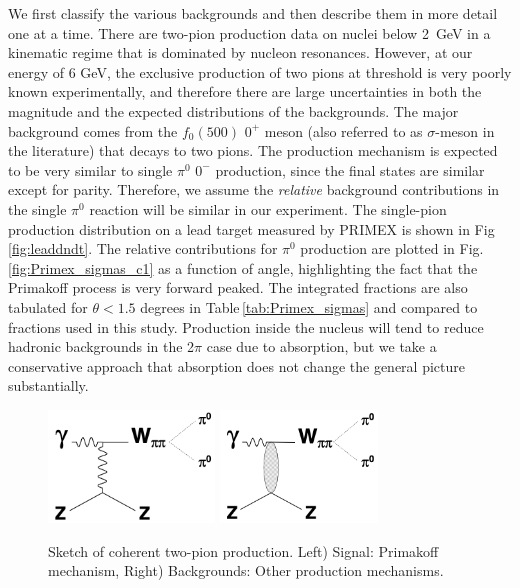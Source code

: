 We first classify the various backgrounds and then describe them in more detail one at a time. There are two-pion production data on nuclei below 2~GeV \cite{schadm2005double} in a kinematic regime that is dominated by nucleon resonances. However, at our energy of 6 GeV, 
the exclusive production of two pions at threshold is very poorly known experimentally, and therefore there are large uncertainties in both the magnitude and the expected distributions of the backgrounds.  The major background comes from the $f_0(500)$ $0^{+}$ meson (also referred to as $\sigma$-meson in the literature) that decays to two pions. The production mechanism is expected to be very similar to single $\pi^0$ $0^{-}$ production, since the final states are similar except for parity. Therefore, we assume the {\em relative} background contributions in the single $\pi^0$ reaction will be similar in our experiment. The single-pion production distribution on a lead target measured by PRIMEX \cite{Larin:2018} is shown in Fig\,\ref{fig:leaddndt}. The relative contributions for $\pi^0$ production are plotted in Fig.\,\ref{fig:Primex_sigmas_c1} as a function of angle, highlighting the fact that the Primakoff process is very forward peaked. The integrated fractions are also tabulated for $\theta < 1.5$ degrees in Table\,\ref{tab:Primex_sigmas} and compared to fractions used in this study.
Production inside the nucleus will tend to reduce hadronic backgrounds in the 2$\pi$ case due to absorption, but we take a conservative approach that absorption does not change the general picture substantially. 

 \begin{figure}[tbh]
\begin{center}
\includegraphics[height=3cm,clip=true]{figures/Diagram_Primakoff.png} \hspace{1cm}
\includegraphics[height=3cm,clip=true]{figures/Diagram_hadronic.png}
\caption{Sketch of coherent two-pion production. Left) Signal: Primakoff mechanism, Right) Backgrounds: Other production mechanisms.
\label{fig:Diagram}}
\end{center}
\end{figure}


